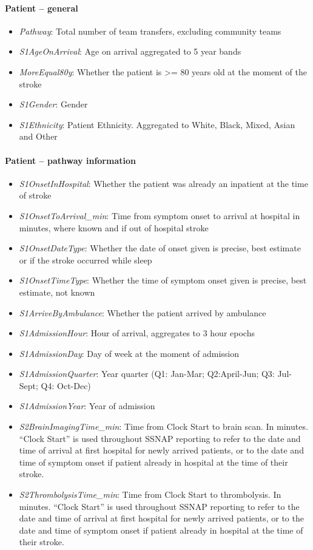 \paragraph{Patient -- general}

\begin{itemize}
\item  \emph{Pathway}: Total number of team transfers, excluding community teams
\item \emph{S1AgeOnArrival}: Age on arrival aggregated to 5 year bands
\item \emph{MoreEqual80y}: Whether the patient is \textgreater= 80 years old at the
  moment of the stroke
\item \emph{S1Gender}: Gender
\item \emph{S1Ethnicity}: Patient Ethnicity. Aggregated to White, Black, Mixed,
  Asian and Other
\end{itemize}


\paragraph{Patient -- pathway information}

\begin{itemize}
\item \emph{S1OnsetInHospital}: Whether the patient was already an inpatient at the
  time of stroke
\item \emph{S1OnsetToArrival\_min}: Time from symptom onset to arrival at hospital
  in minutes, where known and if out of hospital stroke
\item \emph{S1OnsetDateType}: Whether the date of onset given is precise, best
  estimate or if the stroke occurred while sleep
\item \emph{S1OnsetTimeType}: Whether the time of symptom onset given is precise,
  best estimate, not known
\item \emph{S1ArriveByAmbulance}: Whether the patient arrived by ambulance
\item \emph{S1AdmissionHour}: Hour of arrival, aggregates to 3 hour epochs
\item \emph{S1AdmissionDay}: Day of week at the moment of admission
\item \emph{S1AdmissionQuarter}: Year quarter (Q1: Jan-Mar; Q2:April-Jun; Q3:
  Jul-Sept; Q4: Oct-Dec)
\item \emph{S1AdmissionYear}: Year of admission
\item \emph{S2BrainImagingTime\_min}: Time from Clock Start to brain scan. In
  minutes. ``Clock Start'' is used throughout SSNAP reporting to refer
  to the date and time of arrival at first hospital for newly arrived
  patients, or to the date and time of symptom onset if patient already
  in hospital at the time of their stroke.
\item \emph{S2ThrombolysisTime\_min}: Time from Clock Start to thrombolysis. In
  minutes. ``Clock Start'' is used throughout SSNAP reporting to refer
  to the date and time of arrival at first hospital for newly arrived
  patients, or to the date and time of symptom onset if patient already
  in hospital at the time of their stroke.
\end{itemize}

